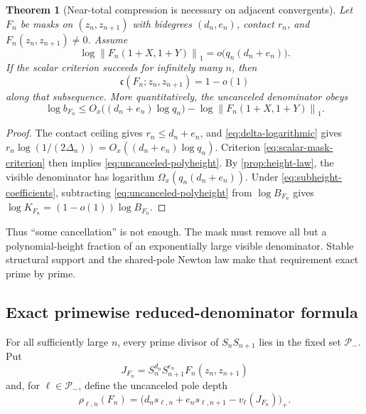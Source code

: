 \documentclass[11pt,oneside]{article}
\newtheorem{theorem}{Theorem}[section]
\theoremstyle{definition}
\theoremstyle{remark}
\newcommand{\normone}[1]{\left\lVert #1\right\rVert_1}
\begin{document}
\begin{theorem}[Near-total compression is necessary on adjacent convergents]
\label{thm:near-total-compression}
Let $F_n$ be masks on $(z_n,z_{n+1})$ with bidegrees $(d_n,e_n)$, contact $r_n$, and
$F_n(z_n,z_{n+1})\ne0$.  Assume
\begin{equation}
 \log\normone{F_n(1+X,1+Y)}=o\bigl(q_n(d_n+e_n)\bigr).
 \label{eq:subheight-coefficients}
\end{equation}
If the scalar criterion succeeds for infinitely many $n$, then
\begin{equation}
 \mathfrak c(F_n;z_n,z_{n+1})=1-o(1)
 \label{eq:compression-to-one}
\end{equation}
along that subsequence.  More quantitatively, the uncanceled denominator obeys
\begin{equation}
 \log b_{F_n}
 \le O_x\bigl((d_n+e_n)\log q_n\bigr)
   -\log\normone{F_n(1+X,1+Y)}.
 \label{eq:uncanceled-polyheight}
\end{equation}
\end{theorem}

\begin{proof}
The contact ceiling gives $r_n\le d_n+e_n$, and
\eqref{eq:delta-logarithmic} gives
$r_n\log(1/(2\Delta_n))=O_x((d_n+e_n)\log q_n)$.  Criterion
\eqref{eq:scalar-mask-criterion} then implies \eqref{eq:uncanceled-polyheight}.  By
\cref{prop:height-law}, the visible denominator has logarithm
$\Omega_x(q_n(d_n+e_n))$.  Under \eqref{eq:subheight-coefficients}, subtracting
\eqref{eq:uncanceled-polyheight} from $\log B_{F_n}$ gives
$\log K_{F_n}=(1-o(1))\log B_{F_n}$.
\end{proof}

Thus ``some cancellation'' is not enough.  The mask must remove all but a polynomial-height
fraction of an exponentially large visible denominator.  Stable structural support and the
shared-pole Newton law make that requirement exact prime by prime.

\subsection{Exact primewise reduced-denominator formula}

For all sufficiently large $n$, every prime divisor of $S_nS_{n+1}$ lies in the fixed set
$\mathcal P_-$.  Put
\[
 J_{F_n}=S_n^{d_n}S_{n+1}^{e_n}F_n(z_n,z_{n+1})
\]
and, for $\ell\in\mathcal P_-$, define the uncanceled pole depth
\begin{equation}
 \rho_{\ell,n}(F_n)
 =\bigl(d_ns_{\ell,n}+e_ns_{\ell,n+1}-v_\ell(J_{F_n})\bigr)_+.
 \label{eq:uncanceled-shared-depth}
\end{equation}
\end{document}
